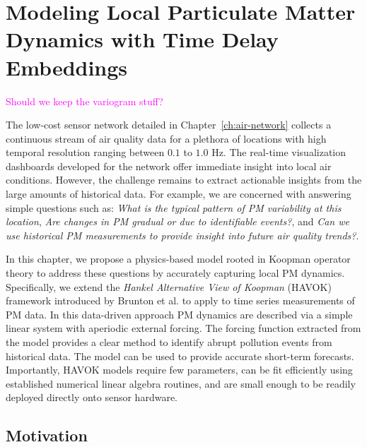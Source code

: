 \chapter{Modeling Local Particulate Matter Dynamics with Time Delay Embeddings}\label{ch:havok}

\textcolor{magenta}{Should we keep the variogram stuff?}


The low-cost sensor network detailed in Chapter~\ref{ch:air-network} collects a
continuous stream of air quality data for a plethora of locations with high
temporal resolution ranging between $0.1$ to $1.0$ Hz. The real-time
visualization dashboards developed for the network offer immediate insight into
local air conditions. However, the challenge remains to extract actionable
insights from the large amounts of historical data. For example, we are concerned
with answering simple questions such as: \textit{What is the typical pattern of
  PM variability at this location}, \textit{Are changes in PM gradual or due to
  identifiable events?}, and \textit{Can we use historical PM measurements to
  provide insight into future air quality trends?}.

In this chapter, we propose a physics-based model rooted in Koopman operator
theory to address these questions by accurately capturing local PM dynamics.
Specifically, we extend the \textit{Hankel Alternative View of Koopman} (HAVOK)
framework introduced by Brunton et al. to apply to time series measurements of
PM data. In this data-driven approach PM dynamics are described via a simple
linear system with aperiodic external forcing. The forcing function extracted
from the model provides a clear method to identify abrupt pollution events from
historical data. The model can be used to provide accurate short-term forecasts.
Importantly, HAVOK models require few parameters, can be fit efficiently using
established numerical linear algebra routines, and are small enough to be
readily deployed directly onto sensor hardware.


\section{Motivation}


